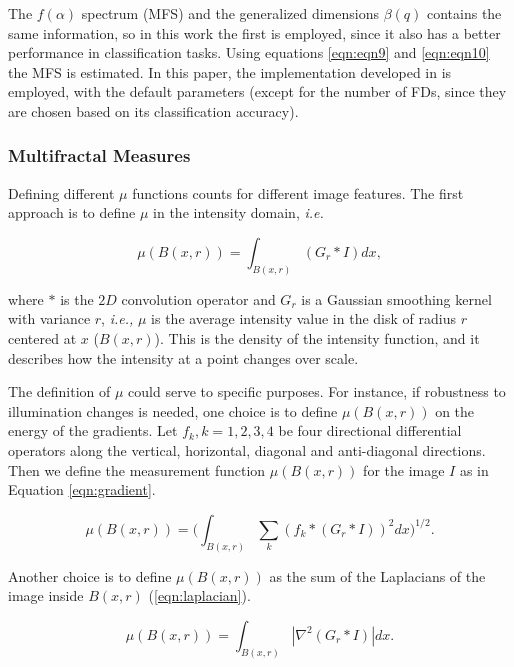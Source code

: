 The $f(\alpha)$ spectrum (MFS) and the generalized dimensions $\beta(q)$ contains the same information, so in this work the first is employed, since it also has a better performance in classification tasks. Using equations \ref{eqn:eqn9} and \ref{eqn:eqn10} the MFS is estimated. In this paper, the implementation developed in \cite{Xu2006} is employed, with the default parameters (except for the number of FDs, since they are chosen based on its classification accuracy).


\subsubsection{Multifractal Measures}
Defining different $\mu$ functions counts for different image features. The first approach is to define $\mu$ in the intensity domain, {\em i.e.}

\begin{equation}
\mu(B(x,r)) = \int_{B(x,r)}{(G_{r} \ast I)} dx,
\label{eqn:eqn11}
\end{equation}

where $\ast$ is the $2D$ convolution operator and $G_{r}$ is a Gaussian smoothing kernel with variance $r$, {\em i.e., } $\mu$ is the average intensity value in the disk of radius $r$ centered at $x$ ($B(x,r)$). This is the density of the intensity function, and it describes how the intensity at a point changes over scale.

The definition of $\mu$ could serve to specific purposes. For instance, if robustness to illumination changes is needed, one choice is to define $\mu(B(x,r))$ on the energy of the gradients. Let ${ f_{k} , k = 1, 2, 3, 4}$ be four directional differential operators along the vertical, horizontal, diagonal and anti-diagonal directions. Then we define the measurement function $\mu(B(x,r))$ for the image $I$ as in Equation \ref{eqn:gradient}.

\begin{equation}
\mu(B(x,r)) = (\int_{B(x,r)}{\sum_{k}{(f_{k} \ast (G_{r} \ast I))^{2}} dx)^{1/2}}.
\label{eqn:gradient}
\end{equation}

Another choice is to define $μ(B(x, r))$ as the sum of the Laplacians of the image inside $B(x, r)$ (\ref{eqn:laplacian}).

\begin{equation}
\mu(B(x,r)) = \int_{B(x,r)}|\nabla^2 (G_{r} \ast I)| dx.
\label{eqn:laplacian}
\end{equation}

